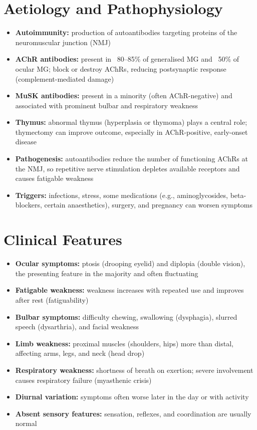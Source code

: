 \section*{Aetiology and Pathophysiology}
\begin{itemize}
    \item \textbf{Autoimmunity:} production of autoantibodies targeting proteins of the neuromuscular junction (NMJ)
    \item \textbf{AChR antibodies:} present in ~80--85\% of generalised MG and ~50\% of ocular MG; block or destroy AChRs, reducing postsynaptic response (complement-mediated damage)
    \item \textbf{MuSK antibodies:} present in a minority (often AChR-negative) and associated with prominent bulbar and respiratory weakness
    \item \textbf{Thymus:} abnormal thymus (hyperplasia or thymoma) plays a central role; thymectomy can improve outcome, especially in AChR-positive, early-onset disease
    \item \textbf{Pathogenesis:} autoantibodies reduce the number of functioning AChRs at the NMJ, so repetitive nerve stimulation depletes available receptors and causes fatigable weakness
    \item \textbf{Triggers:} infections, stress, some medications (e.g., aminoglycosides, beta-blockers, certain anaesthetics), surgery, and pregnancy can worsen symptoms
\end{itemize}

\section*{Clinical Features}
\begin{itemize}
    \item \textbf{Ocular symptoms:} ptosis (drooping eyelid) and diplopia (double vision), the presenting feature in the majority and often fluctuating
    \item \textbf{Fatigable weakness:} weakness increases with repeated use and improves after rest (fatiguability)
    \item \textbf{Bulbar symptoms:} difficulty chewing, swallowing (dysphagia), slurred speech (dysarthria), and facial weakness
    \item \textbf{Limb weakness:} proximal muscles (shoulders, hips) more than distal, affecting arms, legs, and neck (head drop)
    \item \textbf{Respiratory weakness:} shortness of breath on exertion; severe involvement causes respiratory failure (myasthenic crisis)
    \item \textbf{Diurnal variation:} symptoms often worse later in the day or with activity
    \item \textbf{Absent sensory features:} sensation, reflexes, and coordination are usually normal
\end{itemize}

